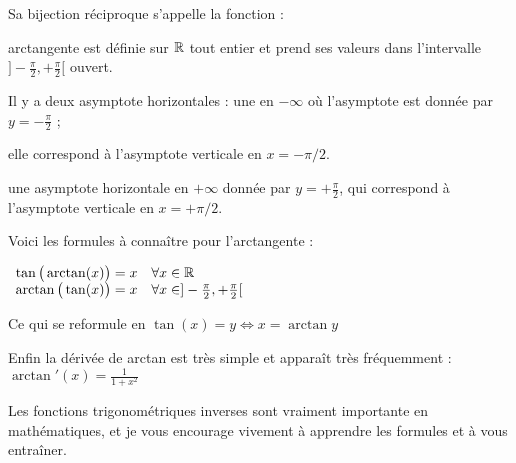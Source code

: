Sa bijection réciproque s'appelle la fonction  :


arctangente est définie sur $\mathbb{R}$ tout entier et prend ses valeurs dans l'intervalle $]-\frac\pi2,+\frac\pi2[$
ouvert.

Il y a deux asymptote horizontales : une en $-\infty$ 
où l'asymptote est donnée par $y=-\frac\pi2$ ;

elle correspond à l’asymptote verticale en $x=-\pi/2$.

une asymptote horizontale en $+\infty$ donnée par $y=+\frac\pi2$,
qui correspond  à l’asymptote verticale en $x=+\pi/2$.





\diapo


Voici les formules à connaître pour l'arctangente :


$
\begin{array}{cl}
\tan\big(\arctan(x)\big) = x &  \forall x \in \mathbb{R}\\
 \arctan\big(\tan(x)\big) = x &  \forall x \in ]-\frac\pi2,+\frac\pi2[ \\
\end{array}
$


Ce qui se reformule en  
$\tan(x)=y \iff x = \arctan y$

Enfin la dérivée de arctan est très simple et apparaît très fréquemment :
$ \arctan'(x) = \frac{1}{1+x^2}$



\diapo

Les fonctions trigonométriques inverses sont vraiment importante en mathématiques, 
et je vous encourage vivement à apprendre les formules et à vous entraîner.




